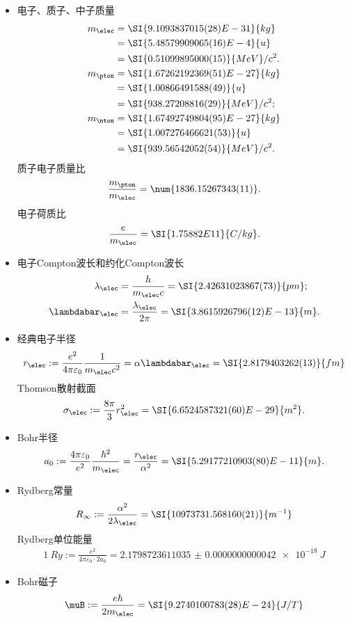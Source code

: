\begin{itemize}
	\item 电子、质子、中子质量
		\begin{align}
			m_\elec&=\SI{9.1093837015(28)E-31}{kg}\\
			&=\SI{5.48579909065(16)E-4}{u}\\
			&=\SI{0.51099895000(15)}{MeV}/c^2.\\
			m_\pton&=\SI{1.67262192369(51)E-27}{kg}\\
			&=\SI{1.00866491588(49)}{u}\\
			&=\SI{938.27208816(29)}{MeV}/c^2;\\
			m_\nton&=\SI{1.67492749804(95)E-27}{kg}\\
			&=\SI{1.007276466621(53)}{u}\\
			&=\SI{939.56542052(54)}{MeV}/c^2.
		\end{align}
		质子电子质量比
		\begin{align}
			\frac{m_\pton}{m_\elec}=\num{1836.15267343(11)}.
		\end{align}
		电子荷质比
		\begin{align}
			\frac e{m_\elec}=\SI{1.75882E11}{C/kg}.
		\end{align}
	
	\item 电子Compton波长和约化Compton波长
		\begin{align}
			\lambda_\elec&=\frac h{m_\elec c}=\SI{2.42631023867(73)}{pm};\\
			\lambdabar_\elec&=\frac{\lambda_\elec}{2\pi}=\SI{3.861 592 6796(12)E-13}{m}.
		\end{align}
	
	\item 经典电子半径
		\begin{align}
			r_\elec:=\frac{e^2}{4\pi\varepsilon_0}\frac1{m_\elec c^2}=\alpha\lambdabar_\elec=\SI{2.8179403262(13)}{fm}
		\end{align}
		Thomson散射截面
		\begin{align}
			\sigma_\elec:=\frac{8\pi}3r_\elec^2=\SI{6.6524587321(60)E-29}{m^2}.
		\end{align}
	
	
	
	\item Bohr半径
		\begin{align}
			a_0:=\frac{4\pi\varepsilon_0}{e^2}\frac{\hbar^2}{m_\elec}=\frac{r_\elec}{\alpha^2}=\SI{5.29177210903(80)E-11}{m}.
		\end{align}
	\item Rydberg常量
		\begin{align}
			R_\infty:=\frac{\alpha^2}{2\lambda_\elec}=\SI{10973731.568160(21)}{m^{-1}}
		\end{align}
		Rydberg单位能量
		\begin{align}
			\SI{1}{Ry}:=\frac{e^2}{4\pi\varepsilon_0\cdot 2a_0}=\SI{2.1798723611035(42)e-18}{J}
		\end{align}
	
	\item Bohr磁子
		\begin{align}
			\muB:=\frac{e\hbar}{2m_\elec}=\SI{9.2740100783(28)E-24}{J/T}
		\end{align}
\end{itemize}
